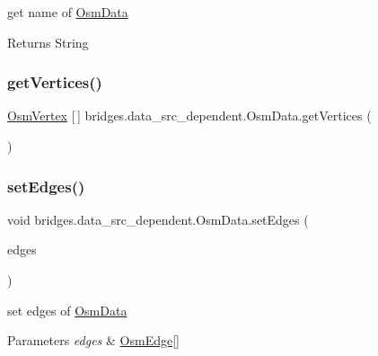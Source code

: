 get name of \mbox{\hyperlink{classbridges_1_1data__src__dependent_1_1_osm_data}{Osm\+Data}} \begin{DoxyReturn}{Returns}
String 
\end{DoxyReturn}
\mbox{\label{classbridges_1_1data__src__dependent_1_1_osm_data_a4dc0a205132f1143e628398e08057362}} 
\subsubsection{\texorpdfstring{getVertices()}{getVertices()}}
{\footnotesize\ttfamily \mbox{\hyperlink{classbridges_1_1data__src__dependent_1_1_osm_vertex}{Osm\+Vertex}} \mbox{[}$\,$\mbox{]} bridges.\+data\+\_\+src\+\_\+dependent.\+Osm\+Data.\+get\+Vertices (\begin{DoxyParamCaption}{ }\end{DoxyParamCaption})}

\mbox{\label{classbridges_1_1data__src__dependent_1_1_osm_data_a88cf686718bcd27a82e2c8fb74b649f2}} 
\subsubsection{\texorpdfstring{setEdges()}{setEdges()}}
{\footnotesize\ttfamily void bridges.\+data\+\_\+src\+\_\+dependent.\+Osm\+Data.\+set\+Edges (\begin{DoxyParamCaption}\item[{\mbox{\hyperlink{classbridges_1_1data__src__dependent_1_1_osm_edge}{Osm\+Edge}} \mbox{[}$\,$\mbox{]}}]{edges }\end{DoxyParamCaption})}

set edges of \mbox{\hyperlink{classbridges_1_1data__src__dependent_1_1_osm_data}{Osm\+Data}} 
\begin{DoxyParams}{Parameters}
{\em edges} & \mbox{\hyperlink{classbridges_1_1data__src__dependent_1_1_osm_edge}{Osm\+Edge}}\mbox{[}\mbox{]} \\
\hline
\end{DoxyParams}
\mbox{\label{classbridges_1_1data__src__dependent_1_1_osm_data_abdc3131be4ca17fcf53a5728a7932bda}} 
